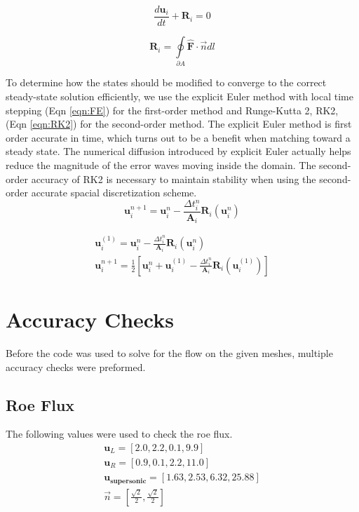 \documentclass{article}
\begin{document}
	\begin{equation}
		\frac{d\mathbf{u}_i}{dt} + \mathbf{R}_i =  0
	\end{equation}


	\begin{equation}
		\mathbf{R}_i = \oint\limits_{\partial{A}} \mathbf{\hat{F}} \cdot \vec{n} dl
	\end{equation}

	To determine how the states should be modified to converge to the correct steady-state solution efficiently, we use the explicit Euler method with local time stepping (Eqn \ref{eqn:FE}) for the first-order method and Runge-Kutta 2, RK2, (Eqn \ref{eqn:RK2}) for the second-order method.
	The explicit Euler method is first order accurate in time, which turns out to be a benefit when matching toward a steady state. The numerical diffusion introduced by explicit Euler actually helps reduce the magnitude of the error waves moving inside the domain.
	The second-order accuracy of RK2 is necessary to maintain stability when using the second-order accurate spacial discretization scheme.
	\begin{equation}
		\mathbf{u}_i^{n+1} = \mathbf{u}_i^{n} - \frac{\Delta t_i^n}{\mathbf{A}_i} \mathbf{R}_i(\mathbf{u}_i^{n})
		\label{eqn:FE}
	\end{equation}

	\begin{eqnarray}
		\mathbf{u}_i^{(1)} = \mathbf{u}_i^{n} - \frac{\Delta t_i^n}{\mathbf{A}_i} \mathbf{R}_i(\mathbf{u}_i^{n}) \\
		\mathbf{u}_i^{n+1} = \frac{1}{2}[\mathbf{u}_i^{n} + \mathbf{u}_i^{(1)} - \frac{\Delta t_i^n}{\mathbf{A}_i} \mathbf{R}_i(\mathbf{u}_i^{(1)})]
		\label{eqn:RK2}
	\end{eqnarray}






\section{Accuracy Checks}
Before the code was used to solve for the flow on the given meshes, multiple accuracy checks were preformed.

\subsection{Roe Flux}

The following values were used to check the roe flux.
\begin{eqnarray*}
	\mathbf{u}_L = [2.0, 2.2, 0.1, 9.9] \\
	\mathbf{u}_R = [0.9, 0.1, 2.2, 11.0] \\
	\mathbf{u_\textrm{supersonic}} = [1.63 ,  2.53,  6.32, 25.88] \\
	\vec{n} = [\frac{\sqrt{2}}{2}, \frac{\sqrt{2}}{2} ]
\end{eqnarray*}
\end{document}
